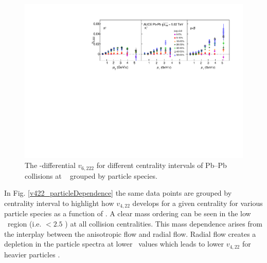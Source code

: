 \begin{figure}[!htb]
\begin{center}
\includegraphics[scale=0.82]{figures/results/All_v6222_gap00_CentDep_PID2.pdf}
\end{center}
\caption{The \pT-differential $v_{6,222}$ for different centrality intervals of Pb--Pb collisions at \sNN~ grouped by particle species.}
\label{v6222_centralityDependence}
\end{figure}

\newpage

In Fig. \ref{v422_particleDependence} the same data points are grouped by centrality interval to highlight how $v_{4,22}$ develops for a given centrality for various particle species as a function of \pT.
A clear mass ordering can be seen in the low \pT~region (i.e. \pT $< 2.5$ \GeV) at all collision centralities. This mass dependence arises from the interplay between the anisotropic flow and radial flow. Radial flow creates a depletion in the particle spectra at lower \pT~values which leads to lower $v_{4,22}$ for heavier particles \cite{Shen:2011eg}.


